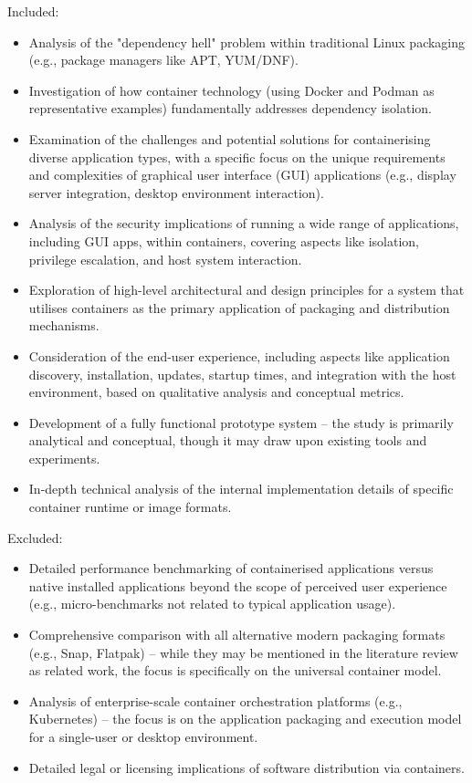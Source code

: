 \documentclass[journal,onecolumn]{IEEEtran}
\begin{document}
Included: 
\begin{itemize}[]
    \item Analysis of the "dependency hell" problem within traditional Linux packaging (e.g., package managers like APT, YUM/DNF). 
    \item Investigation of how container technology (using Docker and Podman as representative examples) fundamentally addresses dependency isolation. 
    \item Examination of the challenges and potential solutions for containerising diverse application types, with a specific focus on the unique requirements and complexities of graphical user interface (GUI) applications (e.g., display server integration, desktop environment interaction). 
    \item Analysis of the security implications of running a wide range of applications, including GUI apps, within containers, covering aspects like isolation, privilege escalation, and host system interaction. 
    \item Exploration of high-level architectural and design principles for a system that utilises containers as the primary application of packaging and distribution mechanisms. 
    \item Consideration of the end-user experience, including aspects like application discovery, installation, updates, startup times, and integration with the host environment, based on qualitative analysis and conceptual metrics.
    \item Development of a fully functional prototype system – the study is primarily analytical and conceptual, though it may draw upon existing tools and experiments.
    \item In-depth technical analysis of the internal implementation details of specific container runtime or image formats. 
\end{itemize}

Excluded:
\begin{itemize}
    \item Detailed performance benchmarking of containerised applications versus native installed applications beyond the scope of perceived user experience (e.g., micro-benchmarks not related to typical application usage). 
    \item Comprehensive comparison with all alternative modern packaging formats (e.g., Snap, Flatpak) – while they may be mentioned in the literature review as related work, the focus is specifically on the universal container model. 
    \item Analysis of enterprise-scale container orchestration platforms (e.g., Kubernetes) – the focus is on the application packaging and execution model for a single-user or desktop environment. 
    \item Detailed legal or licensing implications of software distribution via containers. 
\end{itemize}
\end{document}
